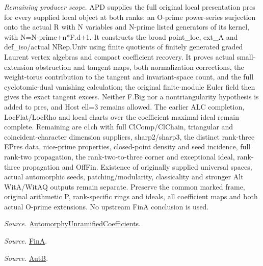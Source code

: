 \documentclass[11pt,a4paper]{article}
\numberwithin{equation}{section}
\theoremstyle{remark}\newtheorem{remark}[theorem]{Remark}
\begin{document}
\emph{Remaining producer scope.} APD supplies the full original local presentation pres for every supplied local object at both ranks: an O-prime power-series surjection onto the actual R with N variables and N-prime listed generators of its kernel, with N=N-prime+n*F.d+1. It constructs the broad point\_\allowbreak loc, ext\_\allowbreak A and def\_\allowbreak iso/actual NRep.Univ using finite quotients of finitely generated graded Laurent vertex algebras and compact coefficient recovery. It proves actual small-extension obstruction and tangent maps, both normalization corrections, the weight-torus contribution to the tangent and invariant-space count, and the full cyclotomic-dual vanishing calculation; the original finite-module Euler field then gives the exact tangent excess. Neither F.Big nor a nontriangularity hypothesis is added to pres, and Host ell=3 remains allowed. The earlier ALC completion, LocFlat/LocRho and local charts over the coefficient maximal ideal remain complete. Remaining are c1ch with full ClComp/ClChain, triangular and coincident-character dimension suppliers, sharp2/sharp3, the distinct rank-three EPres data, nice-prime properties, closed-point density and seed incidence, full rank-two propagation, the rank-two-to-three corner and exceptional ideal, rank-three propagation and OffFin. Existence of originally supplied universal spaces, actual automorphic seeds, patching/modularity, classicality and stronger Alt WitA/WitAQ outputs remain separate. Preserve the common marked frame, original arithmetic P, rank-specific rings and ideals, all coefficient maps and both actual O-prime extensions. No upstream FinA conclusion is used.

\emph{Source.} \href{https://github.com/CocoSgt/riemann-hypothesis-lean/blob/7cbf7a0c32fca1badf05931879a37c3f8a2b03b4/src/Development/AutomorphicArithmetic/AutomorphicVarieties/AutomorphicCases/AutomorphyUnramifiedCoefficients.lean#L24-L27}{AutomorphyUnramifiedCoefficients}.

\emph{Source.} \href{https://github.com/CocoSgt/riemann-hypothesis-lean/blob/7cbf7a0c32fca1badf05931879a37c3f8a2b03b4/src/Development/AutomorphicArithmetic/AutomorphicVarieties/AutomorphicCases/AutomorphyUnramifiedCoefficients.lean#L12-L13}{FinA}.

\emph{Source.} \href{https://github.com/CocoSgt/riemann-hypothesis-lean/blob/7cbf7a0c32fca1badf05931879a37c3f8a2b03b4/src/Development/AutomorphicArithmetic/AutomorphicVarieties/AutomorphicCases/AutomorphyUnramifiedCoefficients.lean#L15-L17}{AutB}.
\end{document}
